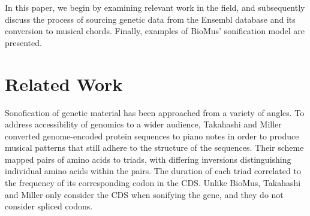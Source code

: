 \documentclass[letterpaper]{article}
\begin{document}





In this paper, we begin by examining relevant work in the field, and subsequently discuss the process of sourcing genetic data from the Ensembl database and its conversion to musical chords. Finally, examples of BioMus' sonification model are presented. 

\section{Related Work}

Sonofication of genetic material has been approached from a variety of angles. To address accessibility of genomics to a wider audience, Takahashi and Miller converted genome-encoded protein sequences to piano notes in order to produce musical patterns that still adhere to the structure of the sequences. Their scheme mapped pairs of amino acids to triads, with differing inversions distinguishing individual amino acids within the pairs. The duration of each triad correlated to the frequency of its corresponding codon in the CDS. Unlike BioMus, Takahashi and Miller only consider the CDS when sonifying the gene, and they do not consider spliced codons. %
\end{document}
